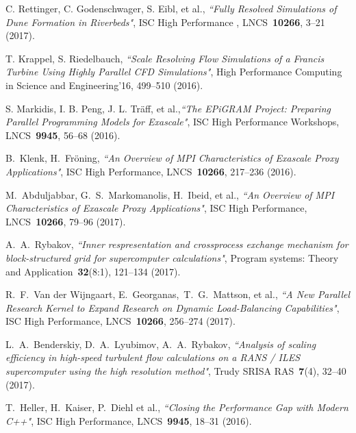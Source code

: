 \documentclass[
11pt,%
tightenlines,%
twoside,%
onecolumn,%
nofloats,%
nobibnotes,%
nofootinbib,%
superscriptaddress,%
noshowpacs,%
centertags]%
{revtex4}
\begin{document}
\begin{thebibliography}{99}


C. Rettinger, C. Godenschwager, S. Eibl, et al., {\it ``Fully Resolved Simulations of Dune Formation in Riverbeds"}, ISC High Performance , LNCS~{\bf 10266}, 3--21 (2017).

T. Krappel, S. Riedelbauch, {\it ``Scale Resolving Flow Simulations of a Francis Turbine Using Highly Parallel CFD Simulations"}, High Performance Computing in Science and Engineering'16, 499--510 (2016).

S. Markidis, I. B. Peng, J. L. Tr\"aff, et al.,{\it ``The EPiGRAM Project: Preparing Parallel Programming Models for Exascale"}, ISC High Performance Workshops, LNCS~{\bf 9945}, 56--68  (2016).

B.~Klenk, H.~Fr\"oning, {\it ``An Overview of MPI Characteristics of Exascale Proxy Applications"}, ISC High Performance, LNCS~{\bf 10266}, 217--236  (2016).

M.~Abduljabbar, G.~S.~Markomanolis, H.~Ibeid, et al., {\it ``An Overview of MPI Characteristics of Exascale Proxy Applications"}, ISC High Performance, LNCS~{\bf 10266}, 79--96 (2017).

A.~A.~Rybakov, {\it ``Inner respresentation and crossprocess exchange mechanism for block-structured grid for supercomputer calculations"}, Program systems: Theory and Application~{\bf 32}(8:1), 121--134 (2017).

R.~F.~Van der Wijngaart, E.~Georganas,~T.~G.~Mattson, et al., {\it ``A New Parallel Research Kernel to Expand Research on Dynamic Load-Balancing Capabilities"}, ISC High Performance, LNCS~{\bf 10266}, 256--274 (2017).

L.~A.~Benderskiy, D.~A.~Lyubimov, A.~A.~Rybakov, {\it ``Analysis of scaling efficiency in high-speed turbulent flow calculations on a RANS / ILES supercomputer using the high resolution method"}, Trudy SRISA RAS~{\bf 7}(4), 32--40 (2017).

T.~Heller, H.~Kaiser, P.~Diehl et al., {\it ``Closing the Performance Gap with Modern C++"}, ISC High Performance, LNCS~{\bf 9945}, 18--31 (2016).


\end{thebibliography}
\end{document}
